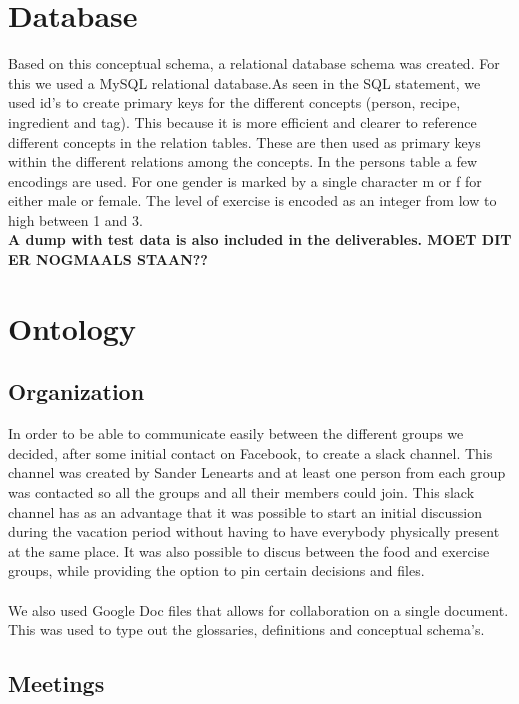 \section{Database}
Based on this conceptual schema, a relational database schema was created. For this we used a MySQL relational database.As seen in the SQL statement, we used id's to create primary keys for the different concepts (person, recipe, ingredient and tag). This because it is more efficient and clearer to reference different concepts in the relation tables. These are then used as primary keys within the different relations among the concepts. In the persons table a few encodings are used. For one gender is marked by a single character m or f for either male or female. The level of exercise is encoded as an integer from low to high between 1 and 3.\\
\textbf{A dump with test data is also included in the deliverables. MOET DIT ER NOGMAALS STAAN??}

\section{Ontology}

\subsection{Organization}

In order to be able to communicate easily between the different groups we decided, after some initial contact on Facebook, to create a slack channel. This channel was created by Sander Lenearts and at least one person from each group was contacted so all the groups and all their members could join. This slack channel has as an advantage that it was possible to start an initial discussion during the vacation period without having to have everybody physically present at the same place. It was also possible to discus between the food and exercise groups, while providing the option to pin certain decisions and files.\\ \\
We also used Google Doc files that allows for collaboration on a single document. This was used to type out the glossaries, definitions and conceptual schema's.

\subsection{Meetings}

